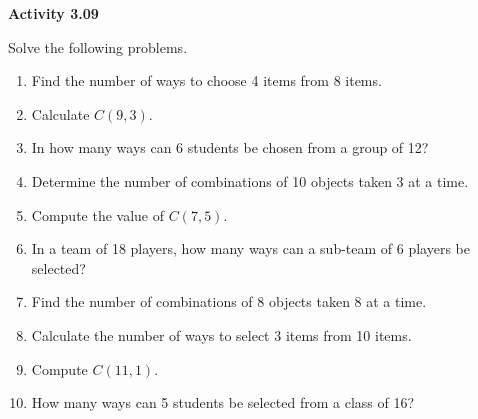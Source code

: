 \vspace{0.3ex}
\noindent\textbf{Activity 3.09}

\vspace{0.2ex}

Solve the following problems. 

\begin{enumerate}[label=\color{blue}\arabic*.]
    \item Find the number of ways to choose 4 items from 8 items.
    \item Calculate \(C(9, 3)\).
    \item In how many ways can 6 students be chosen from a group of 12?
    \item Determine the number of combinations of 10 objects taken 3 at a time.
    \item Compute the value of \(C(7, 5)\).
    \item In a team of 18 players, how many ways can a sub-team of 6 players be selected?
    \item Find the number of combinations of 8 objects taken 8 at a time.
    \item Calculate the number of ways to select 3 items from 10 items.
    \item Compute \(C(11, 1)\).
    \item How many ways can 5 students be selected from a class of 16?
\end{enumerate}
